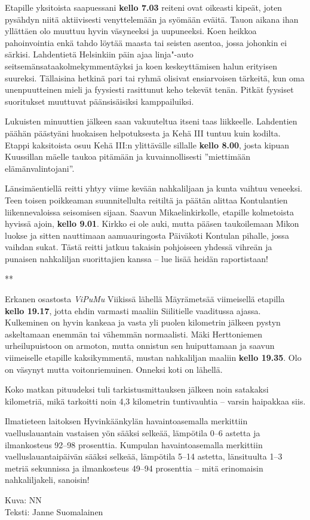 \begin{multicols}{2}
Etapille yksitoista saapuessani \textbf{kello 7.03} reiteni ovat oikeasti kipeät, joten pysähdyn niitä aktiivisesti venyttelemään ja syömään eväitä. Tauon aikana ihan yllättäen olo muuttuu hyvin väsyneeksi ja uupuneeksi. Koen heikkoa pahoinvointia enkä tahdo löytää maasta tai seisten asentoa, jossa johonkin ei särkisi. Lahdentietä Helsinkiin päin ajaa linja"-auto seitsemänsataakolmekymmentäyksi ja koen keskeyttämisen halun erityisen suureksi. Tällaisina hetkinä pari tai ryhmä olisivat ensiarvoisen tärkeitä, kun oma unenpuutteinen mieli ja fyysiesti rasittunut keho tekevät tenän. Pitkät fyysiset suoritukset muuttuvat päänsisäisiksi kamppailuiksi.

Lukuisten minuuttien jälkeen saan vakuuteltua itseni taas liikkeelle. Lahdentien päähän päästyäni huokaisen helpotuksesta ja Kehä III tuntuu kuin kodilta. Etappi kaksitoista osuu Kehä III:n ylittävälle sillalle \textbf{kello 8.00}, josta kipuan Kuussillan mäelle taukoa pitämään ja kuvainnollisesti ''miettimään elämänvalintojani''. 

Länsimäentiellä reitti yhtyy viime kevään nahkaliljaan ja kunta vaihtuu veneeksi. Teen toisen poikkeaman suunnitellulta reitiltä ja päätän alittaa Kontulantien liikennevaloissa seisomisen sijaan. Saavun Mikaelinkirkolle, etapille kolmetoista hyvissä ajoin, \textbf{kello 9.01}. Kirkko ei ole auki, mutta pääsen taukoilemaan Mikon luokse ja sitten nauttimaan aamuauringosta Päiväkoti Kontulan pihalle, jossa vaihdan sukat. Tästä reitti jatkuu takaisin pohjoiseen yhdessä vihreän ja punaisen nahkaliljan suorittajien kanssa -- lue lisää heidän raportistaan!

{\smallskip\noindent\centering ***\par\smallskip}

Erkanen osastosta \textit{ViPuMu} Viikissä lähellä Mäyrämetsää viimeisellä etapilla \textbf{kello 19.17}, jotta ehdin varmasti maaliin Siilitielle vaaditussa ajassa. Kulkeminen on hyvin kankeaa ja vasta yli puolen kilometrin jälkeen pystyn askeltamaan enemmän tai vähemmän normaalisti. Mäki Herttoniemen urheilupuistoon on armoton, mutta onnistun sen huiputtamaan ja saavun viimeiselle etapille kaksikymmentä, mustan nahkaliljan maaliin \textbf{kello 19.35}. Olo on väsynyt mutta voitonriemuinen. Onneksi koti on lähellä.

Koko matkan pituudeksi tuli tarkistusmittauksen jälkeen noin satakaksi kilometriä, mikä tarkoitti noin 4,3 kilometrin tuntivauhtia -- varsin haipakkaa siis.

Ilmatieteen laitoksen Hyvinkäänkylän havaintoasemalla merkittiin vaelluslauantain vastaisen yön sääksi selkeää, lämpötila 0--6 astetta ja ilmankosteus 92--98 prosenttia. Kumpulan havaintoasemalla merkittiin vaelluslauantaipäivän sääksi selkeää, lämpötila 5--14 astetta, länsituulta 1--3 metriä sekunnissa ja ilmankosteus 49--94 prosenttia -- mitä erinomaisin nahkaliljakeli, sanoisin!
\end{multicols}

\vspace*{.50cm}
{\raggedleft Kuva: NN\\
Teksti: Janne Suomalainen\par}
